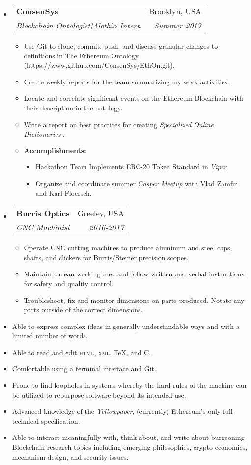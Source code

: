 \documentclass[letterpaper,10pt]{article}
\makeatletter
\newlength{\outerbordwidth}
\newcommand{\resitem}[1]{\item #1 \vspace{-2pt}}
\newcommand{\resheading}[1]{\vspace{8pt}
  \parbox{\textwidth}{\setlength{\FrameSep}{\outerbordwidth}
    \begin{shaded}
\setlength{\fboxsep}{0pt}\framebox[\textwidth][l]{\setlength{\fboxsep}{4pt}\fcolorbox{shadecolorB}{shadecolorB}{\textbf{\sffamily{\mbox{~}\makebox[6.762in][l]{\large #1} \vphantom{p\^{E}}}}}}
    \end{shaded}
  }\vspace{-5pt}
}
\newcommand{\ressubheading}[4]{
\begin{tabular*}{6.5in}{l@{\cftdotfill{\cftsecdotsep}\extracolsep{\fill}}r}
		\textbf{#1} & #2 \\
		\textit{#3} & \textit{#4} \\
\end{tabular*}\vspace{-6pt}}
\makeatother
\begin{document}
\begin{itemize}

	\item \ressubheading{ConsenSys}{Brooklyn, USA}{Blockchain Ontologist|Alethio Intern}{Summer 2017}

\begin{itemize}
	\resitem{Use Git to clone, commit, push, and discuss granular changes to definitions in The Ethereum Ontology (https://www.github.com/ConsenSys/EthOn.git).} 
	\resitem{Create weekly reports for the team summarizing my work activities.}
	\resitem{Locate and correlate significant events on the Ethereum Blockchain with their description in the ontology.}
	\resitem{Write a report on best practices for creating \textit{Specialized Online Dictionaries}}.
	\resitem{\textbf{Accomplishments:}}
		\begin{itemize}
				\resitem{Hackathon Team Implements ERC-20 Token Standard in \textit{Viper}}
				\resitem{Organize and coordinate summer \textit{Casper Meetup} with Vlad Zamfir and Karl Floersch.}
		\end{itemize}
\end{itemize}

\item \ressubheading{Burris Optics}{Greeley, USA}{CNC Machinist}{2016-2017}

	\begin{itemize}
		\resitem{Operate CNC cutting machines to produce aluminum and steel caps, shafts, and clickers for Burris/Steiner precision scopes.}
		\resitem{Maintain a clean working area and follow written and verbal instructions for safety and quality control.}
		\resitem{Troubleshoot, fix and monitor dimensions on parts produced. Notate any parts outside of the correct dimensions.}
	\end{itemize}

\end{itemize}


\resheading{Skills}

\begin{itemize}
	\resitem{Able to express complex ideas in generally understandable ways and with a limited number of words.}
	\resitem{Able to read and edit \textsc{html}, \textsc{xml}, \TeX, and \textsc{C}.}
	\resitem{Comfortable using a terminal interface and Git.}
	\resitem{Prone to find loopholes in systems whereby the hard rules of the machine can be utilized to repurpose software beyond its intended use.}
	\resitem{Advanced knowledge of the \textit{Yellowpaper}, (currently) Ethereum's only full technical specification.}
	\resitem{Able to interact meaningfully with, think about, and write about burgeoning Blockchain research topics including emerging philosophies, crypto-economics, mechanism design, and security issues.}
\end{itemize}
\end{document}
